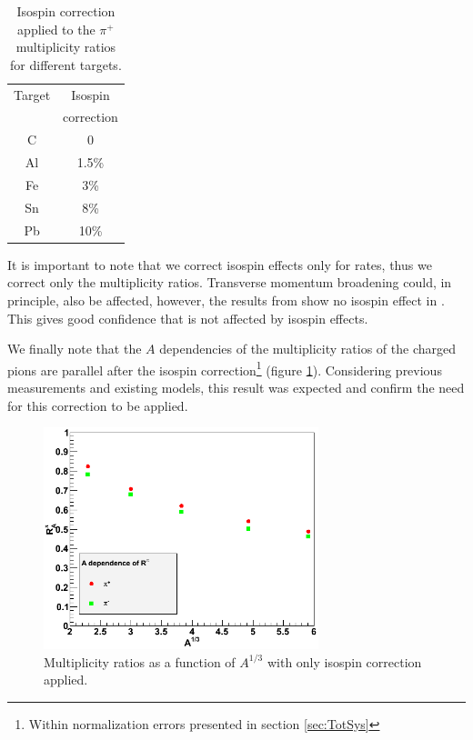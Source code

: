\begin{table}[htbp]
  \centering
  \begin{tabular}{@{} cc @{}}
    \hline
    Target & Isospin  \\ 
           & correction \\ 
    \hline
    C & 0 \\
    Al & 1.5\%\\
    Fe &  3\% \\
    Sn &  8\%\\
    Pb &  10\% \\
    \hline
  \end{tabular}
  \caption{Isospin correction applied to the $\pi^+$ multiplicity ratios for different targets.}
  \label{tab:isospin}
\end{table}

It is important to note that we correct isospin effects only for rates, thus 
we correct only the multiplicity ratios. Transverse momentum broadening could, in 
principle, also be affected, however, the results from \cite{Asaturyan:2011mq} 
show no isospin effect in \ptp. This gives good confidence that \dpt is not 
affected by isospin effects.

We finally note that the $A$ dependencies of the multiplicity ratios of the 
charged pions are parallel after the isospin correction\footnote{Within 
normalization errors presented in section \ref{sec:TotSys}} (figure 
\ref{fig:IsoPlot}). Considering previous measurements and existing models, 
this result was expected and confirm the need for this correction to be applied.

\begin{figure}[tbp]
\centering
\includegraphics[width=8cm] {chap5-fig/c_RvA.png}
\caption {Multiplicity ratios as a function of $A^{1/3}$ 
with only isospin correction applied.}
\label{fig:IsoPlot}
\end{figure}

